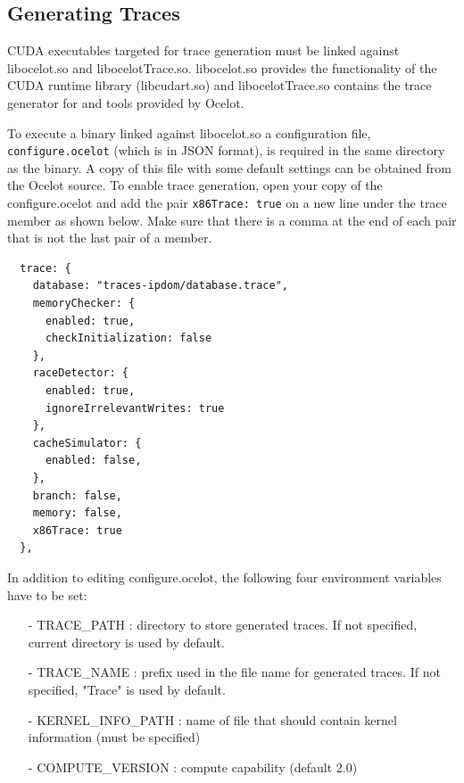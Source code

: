 

\subsection{Generating Traces}

CUDA executables targeted for trace generation must be linked against
libocelot.so and libocelotTrace.so. libocelot.so provides the functionality of
the CUDA runtime library (libcudart.so) and libocelotTrace.so contains the
trace generator for \SIM and tools provided by Ocelot.

To execute a binary linked against libocelot.so a configuration file,
\Verb+configure.ocelot+ (which is in JSON format), is required in the same
directory as the binary. A copy of this file with some default settings can
be obtained from the Ocelot source. To enable trace generation, open your
copy of the configure.ocelot and add the pair \Verb+x86Trace: true+ on a new
line under the trace member as shown below.  Make sure that there is a comma
at the end of each pair that is not the last pair of a member.

\begin{Verbatim}
  trace: {
    database: "traces-ipdom/database.trace",
    memoryChecker: {
      enabled: true,
      checkInitialization: false
    },
    raceDetector: {
      enabled: true,
      ignoreIrrelevantWrites: true
    },
    cacheSimulator: {
      enabled: false,
    },
    branch: false,
    memory: false,
    x86Trace: true
  },
\end{Verbatim}

In addition to editing configure.ocelot, the following four environment
variables have to be set:

\begin{itemize}\itemsep2pt
\item[-] TRACE\_PATH : directory to store generated traces. If not specified, current directory is used by default.
\item[-] TRACE\_NAME : prefix used in the file name for generated traces. If not specified, "Trace" is used by default.
\item[-] KERNEL\_INFO\_PATH : name of file that should contain kernel information (must be specified)
\item[-] COMPUTE\_VERSION : compute capability (default 2.0)
\end{itemize}


